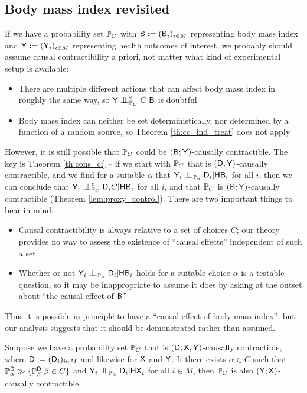 \subsection{Body mass index revisited}

If we have a probability set $\mathbb{P}_C$ with $\mathsf{B}:=(\mathsf{B}_i)_{i\in M}$ representing body mass index and $\mathsf{Y}:=(\mathsf{Y}_i)_{i\in M}$ representing health outcomes of interest, we probably should assume causal contractibility a priori, not matter what kind of experimental setup is available:

\begin{itemize}
    \item There are multiple different actions that can affect body mass index in roughly the same way, so $\RV{Y}\CI_{\prob{P}_C}^e C|\RV{B}$ is doubtful
    \item Body mass index can neither be set deterministically, nor determined by a function of a random source, so Theorem \ref{th:cc_ind_treat} does not apply
\end{itemize} 

However, it is still possible that $\mathbb{P}_C$ could be $(\mathsf{B};\mathsf{Y})$-causally contractible. The key is Theorem \ref{th:cons_ci} -- if we start with $\mathbb{P}_C$ that is $(\mathsf{D};\mathsf{Y})$-causally contractible, and we find for a suitable $\alpha$ that $\RV{Y}_i\CI_{\prob{P}_\alpha} \RV{D}_i |\RV{H}\RV{B}_i$ for all $i$, then we can conclude that $\RV{Y}_i\CI_{\prob{P}_C}^e \RV{D}_i C|\RV{H}\RV{B}_i$ for all $i$, and that $\mathbb{P}_C$ is $(\mathsf{B};\mathsf{Y})$-causally contractible (Theorem \ref{lem:proxy_control}). There are two important things to bear in mind:

\begin{itemize}
    \item Causal contractibility is always relative to a set of choices $C$; our theory provides no way to assess the existence of ``causal effects'' independent of such a set
    \item Whether or not $\RV{Y}_i\CI_{\prob{P}_\alpha} \RV{D}_i |\RV{H}\RV{B}_i$ holds for a suitable choice $\alpha$ is a testable question, so it may be inappropriate to assume it does by asking at the outset about ``the causal effect of $\mathsf{B}$''
\end{itemize}

Thus it is possible in principle to have a ``causal effect of body mass index'', but our analysis suggests that it should be demonstrated rather than assumed.

\begin{theorem}\label{lem:proxy_control}
Suppose we have a probability set $\mathbb{P}_C$ that is $(\mathsf{D};\mathsf{X},\mathsf{Y})$-causally contractible, where $\mathsf{D}:=(\mathsf{D}_i)_{i\in M}$ and likewise for $\mathsf{X}$ and $\mathsf{Y}$. If there exists $\alpha\in C$ such that $\mathbb{P}_\alpha^{\mathsf{D}}\gg \{\mathbb{P}_\beta^{\mathsf{D}}|\beta\in C\}$ and $\RV{Y}_i\CI_{\prob{P}_\alpha} \RV{D}_i|\RV{HX}_i$ for all $i\in M$, then $\mathbb{P}_C$ is also $(\mathsf{Y};\mathsf{X})$-causally contractible.
\end{theorem}

